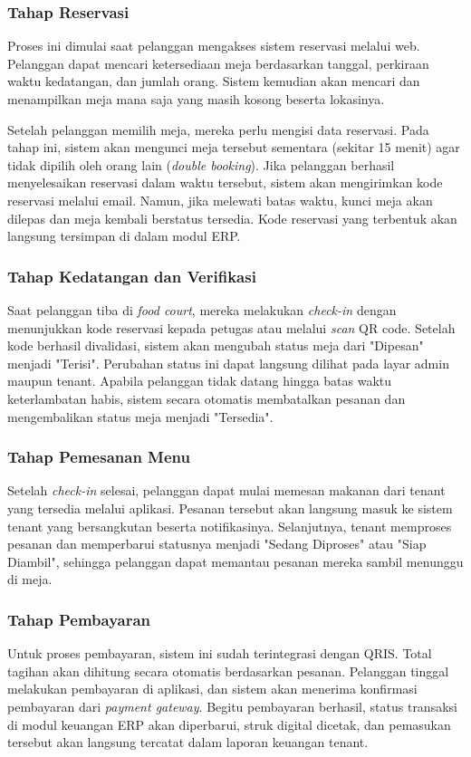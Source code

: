 \documentclass[conference]{IEEEtran}
\begin{document}
\subsubsection{Tahap Reservasi}
Proses ini dimulai saat pelanggan mengakses sistem reservasi melalui web. Pelanggan dapat mencari ketersediaan meja berdasarkan tanggal, perkiraan waktu kedatangan, dan jumlah orang. Sistem kemudian akan mencari dan menampilkan meja mana saja yang masih kosong beserta lokasinya. 

Setelah pelanggan memilih meja, mereka perlu mengisi data reservasi. Pada tahap ini, sistem akan mengunci meja tersebut sementara (sekitar 15 menit) agar tidak dipilih oleh orang lain (\textit{double booking}). Jika pelanggan berhasil menyelesaikan reservasi dalam waktu tersebut, sistem akan mengirimkan kode reservasi melalui email. Namun, jika melewati batas waktu, kunci meja akan dilepas dan meja kembali berstatus tersedia. Kode reservasi yang terbentuk akan langsung tersimpan di dalam modul ERP.

\subsubsection{Tahap Kedatangan dan Verifikasi}
Saat pelanggan tiba di \textit{food court}, mereka melakukan \textit{check-in} dengan menunjukkan kode reservasi kepada petugas atau melalui \textit{scan} QR code. Setelah kode berhasil divalidasi, sistem akan mengubah status meja dari "Dipesan" menjadi "Terisi". Perubahan status ini dapat langsung dilihat pada layar admin maupun tenant. Apabila pelanggan tidak datang hingga batas waktu keterlambatan habis, sistem secara otomatis membatalkan pesanan dan mengembalikan status meja menjadi "Tersedia".

\subsubsection{Tahap Pemesanan Menu}
Setelah \textit{check-in} selesai, pelanggan dapat mulai memesan makanan dari tenant yang tersedia melalui aplikasi. Pesanan tersebut akan langsung masuk ke sistem tenant yang bersangkutan beserta notifikasinya. Selanjutnya, tenant memproses pesanan dan memperbarui statusnya menjadi "Sedang Diproses" atau "Siap Diambil", sehingga pelanggan dapat memantau pesanan mereka sambil menunggu di meja.

\subsubsection{Tahap Pembayaran}
Untuk proses pembayaran, sistem ini sudah terintegrasi dengan QRIS. Total tagihan akan dihitung secara otomatis berdasarkan pesanan. Pelanggan tinggal melakukan pembayaran di aplikasi, dan sistem akan menerima konfirmasi pembayaran dari \textit{payment gateway}. Begitu pembayaran berhasil, status transaksi di modul keuangan ERP akan diperbarui, struk digital dicetak, dan pemasukan tersebut akan langsung tercatat dalam laporan keuangan tenant.
\end{document}
